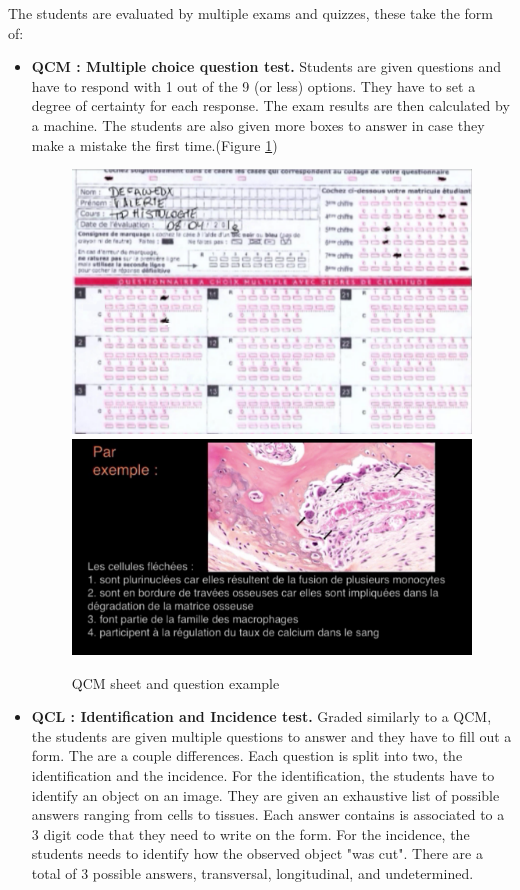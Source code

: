 \documentclass[a4paper,11pt]{report}
\numberwithin{figure}{section} %
\begin{document}

	The students are evaluated by multiple exams and quizzes, these take the form of:
    \begin{itemize}
    \item[\textbullet]  \textbf{QCM : Multiple choice question test.}
    Students are given questions and have to respond with 1 out of the 9 (or less) options.
    They have to set a degree of certainty for each response.
    The exam results are then calculated by a machine.
    The students are also given more boxes to answer in case they make a mistake the first time.(Figure \ref{fig:qcm})
    \begin{figure}[H]
    \centering
     \includegraphics[width=0.4\linewidth]{images/exam_qcm.png}
     \includegraphics[width=0.5\linewidth]{images/exam_qcm2.png}
     \caption{QCM sheet and question example}
     \label{fig:qcm}
    \end{figure}
	\item[\textbullet]  \textbf{QCL : Identification and Incidence test.}
	Graded similarly to a QCM, the students are given multiple questions to answer and they have to fill out a form.
	The are a couple differences.
	Each question is split into two, the identification and the incidence.
	For the identification, the students have to identify an object on an image.
	They are given an exhaustive list of possible answers ranging from cells to tissues.
	Each answer contains is associated to a 3 digit code that they need to write on the form.
	For the incidence, the students needs to identify how the observed object "was cut".
	There are a total of 3 possible answers, transversal, longitudinal, and undetermined.

\end{itemize}
\end{document}
